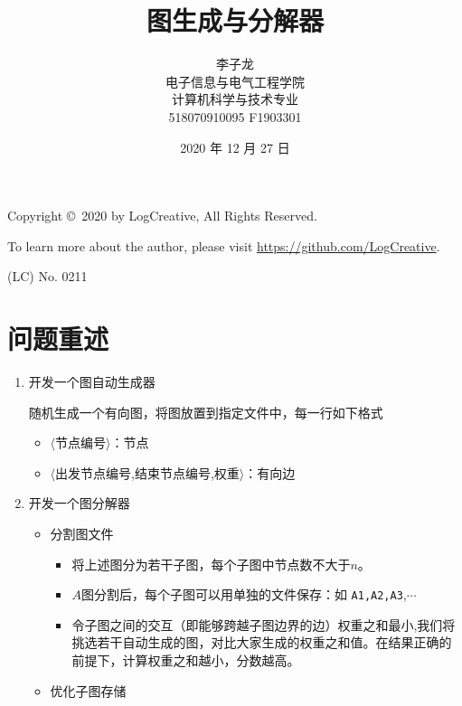 \documentclass[a4paper,12pt]{article}
\begin{document}
\begin{CJK}{UTF8}{song}
\title{图生成与分解器}
\author{李子龙\\\small 电子信息与电气工程学院\\\small 计算机科学与技术专业\\\small 518070910095 F1903301}
\date{2020 年 12 月 27 日}
\maketitle
\normalsize

\tableofcontents

\begin{tcolorbox}
  Copyright \copyright\ 2020 by LogCreative, All Rights Reserved.
  
  To learn more about the author, please visit \href{https://github.com/LogCreative}{https://github.com/LogCreative}.

  (LC) No. 0211
\end{tcolorbox}

\section{问题重述}

\begin{enumerate}
    \item 开发一个图自动生成器
    
    随机生成一个有向图，将图放置到指定文件中，每一行如下格式
    \begin{itemize}
        \item $\langle$节点编号$\rangle$：节点
        \item $\langle$出发节点编号,结束节点编号,权重$\rangle$：有向边
    \end{itemize}

    \item 开发一个图分解器
    \begin{itemize}
        \item 分割图文件
        \begin{itemize}
            \item 将上述图分为若干子图，每个子图中节点数不大于$n$。
            \item $A$图分割后，每个子图可以用单独的文件保存：如 \texttt{A1,A2,A3},$\cdots$
            \item 令子图之间的交互（即能够跨越子图边界的边）权重之和最小,我们将挑选若干自动生成的图，对比大家生成的权重之和值。在结果正确的前提下，计算权重之和越小，分数越高。
        \end{itemize}
        \item 优化子图存储
        

\end{itemize}
\end{enumerate}
\end{CJK}
\end{document}
